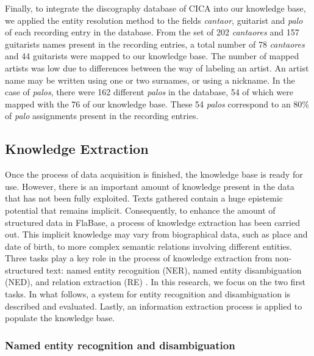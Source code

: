 Finally, to integrate the discography database of CICA into our knowledge base, we applied the entity resolution method to the fields \textit{cantaor}, guitarist and \textit{palo} of each recording entry in the database. From the set of 202 \textit{cantaores} and 157 guitarists names present in the recording entries, a total number of 78 \textit{cantaores} and 44 guitarists were mapped to our knowledge base. The number of mapped artists was low due to differences between the way of labeling an artist. An artist name may be written using one or two surnames, or using a nickname. In the case of \textit{palos}, there were 162 different \textit{palos} in the database, 54 of which were mapped with the 76 of our knowledge base. These 54 \textit{palos} correspond to an 80\% of \textit{palo} assignments present in the recording entries.


\subsection{Knowledge Extraction}\label{sec:kb_extraction}

Once the process of data acquisition is finished, the knowledge base is ready for use. However, there is an important amount of knowledge present in the data that has not been fully exploited. Texts gathered contain a huge epistemic potential that remains implicit. Consequently, to enhance the amount of structured data in FlaBase, a process of knowledge extraction has been carried out. This implicit knowledge may vary from biographical data, such as place and date of birth, to more complex semantic relations involving different entities. Three tasks play a key role in the process of knowledge extraction from non-structured text: named entity recognition (NER), named entity disambiguation (NED), and relation extraction (RE) \cite{Usbeck2014}. In this research, we focus on the two first tasks. In what follows, a system for entity recognition and disambiguation is described and evaluated. Lastly, an information extraction process is applied to populate the knowledge base.

\subsubsection{Named entity recognition and disambiguation}\label{sec:entity_linking}

